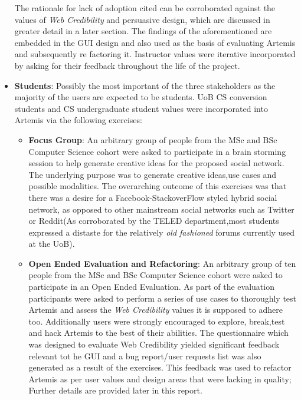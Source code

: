 \begin{itemize}
    The rationale for lack of adoption cited can be corroborated against the values of \textit{Web Credibility} and persuasive design, which are discussed in greater detail in a later section. The findings of the aforementioned are embedded in the GUI design and also used as the basis of evaluating Artemis and subsequently re factoring it. Instructor values were iterative incorporated by asking for their feedback throughout the life of the project.


    \newpage    
    \item \textbf{Students}: Possibly the most important of the three stakeholders as the majority of the users are expected to be students. UoB CS conversion students and CS undergraduate student values were incorporated into Artemis via the following exercises:
    
    \begin{itemize}
        
        \item \textbf{Focus Group}: An arbitrary group of people from the MSc and BSc Computer Science cohort were asked to participate in a brain storming session to help generate creative ideas for the proposed social  network. The underlying purpose was to generate creative ideas,use cases and possible modalities. The overarching outcome of this exercises was that there was a desire for a Facebook-StackoverFlow styled hybrid social network, as opposed to other mainstream social networks such as Twitter or Reddit(As corroborated by the TELED department,most students expressed a distaste for the relatively \textit{old fashioned} forums currently used at the UoB).

        \item \textbf{Open Ended Evaluation and Refactoring}:  An arbitrary group of ten people from the MSc and BSc Computer Science cohort were asked to participate in an Open Ended Evaluation. As part of the  evaluation participants were asked to perform a series of use cases to thoroughly test Artemis and assess the \textit{Web Credibility} values it is supposed to adhere too. Additionally users were strongly encouraged to explore, break,test and hack Artemis to the best of their abilities. The questionnaire which was designed to evaluate Web Credibility yielded significant feedback relevant tot he GUI and a bug report/user requests list was also generated as a result of the exercises. This feedback was used to refactor Artemis as per user values and design areas that were lacking in quality; Further details are provided later in this report.
        
        
    \end{itemize}
    
\end{itemize}

